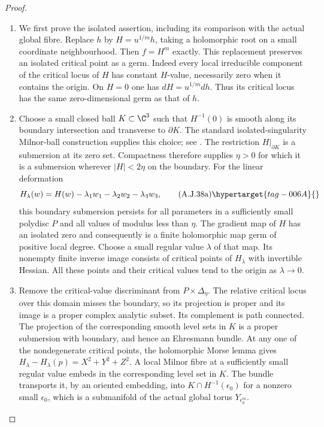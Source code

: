 \begin{proof}

\begin{enumerate}[label={$\langle1\rangle$\arabic*.},leftmargin=*]
\item We first prove the isolated assertion, including its
comparison with the actual global fibre. Replace $h$
by $H=u^{1/m}h$, taking a holomorphic root on a small
coordinate neighbourhood. Then $f=H^m$ exactly.
This replacement preserves an isolated critical point
as a germ. Indeed every local irreducible component
of the critical locus of $H$ has constant $H$-value,
necessarily zero when it contains the origin. On
$H=0$ one has $dH=u^{1/m}dh$. Thus its critical
locus has the same zero-dimensional germ as that
of $h$.

\item Choose a small closed ball $K\subset\C^3$ such that
$H^{-1}(0)$ is smooth along its boundary intersection
and transverse to $\partial K$.
The standard isolated-singularity Milnor-ball
construction supplies this choice; see
\cite[Lemma 6.1 and Appendix B]{Milnor1968}.
The restriction $H|_{\partial K}$ is a submersion
at its zero set. Compactness therefore supplies
$\eta>0$ for which it is a submersion wherever
$|H|<2\eta$ on the boundary. For the linear
deformation
\[
 H_\lambda(w)=H(w)-\lambda_1w_1
                         -\lambda_2w_2-\lambda_3w_3,
                                                        \tag{A.J.38a}\hypertarget{tag-006A}{}\label{cdp:eq:A.J.38a}
\]
this boundary submersion persists for all parameters
in a sufficiently small polydisc $P$ and all values
of modulus less than $\eta$. The gradient map of
$H$ has an isolated zero and consequently is a finite
holomorphic map germ of positive local degree. Choose
a small regular value $\lambda$ of that map. Its
nonempty finite inverse image consists of critical
points of $H_\lambda$ with invertible Hessian. All
these points and their critical values tend to the
origin as $\lambda\to0$.

\item Remove the critical-value discriminant from
$P\times\Delta_\eta$. The relative critical locus
over this domain misses the boundary, so its
projection is proper and its image is a proper
complex analytic subset. Its complement is path
connected. The projection of the corresponding
smooth level sets in $K$ is a proper submersion
with boundary, and hence an Ehresmann bundle.
At any one of the nondegenerate critical points,
the holomorphic Morse lemma gives
$H_\lambda-H_\lambda(p)=X^2+Y^2+Z^2$.
A local Milnor fibre at a sufficiently small regular
value embeds in the corresponding level set in $K$.
The bundle transports it, by an oriented embedding,
into $K\cap H^{-1}(\epsilon_0)$ for a nonzero small
$\epsilon_0$, which is a submanifold of the actual
global torus $Y_{\epsilon_0^m}$.


\end{enumerate}
\end{proof}
